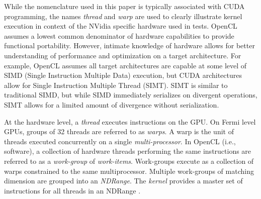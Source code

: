 
While the nomenclature used in this paper is typically associated with CUDA programming, the names \textit{thread} and \textit{warp} are used to clearly illustrate kernel execution in context of the NVidia specific hardware used in tests. OpenCL assumes a lowest common denominator of hardware capabilities to provide functional portability. However, intimate knowledge of hardware allows for better understanding of performance and optimization on a target architecture. For example, OpenCL assumes all target architectures are capable at some level of SIMD (Single Instruction Multiple Data) execution, but CUDA architectures allow for Single Instruction Multiple Thread (SIMT). SIMT is similar to traditional SIMD, but while SIMD immediately serializes on divergent operations, SIMT allows for a limited amount of divergence without serialization. 

At the hardware level, a \textit{thread} executes instructions on the GPU. On Fermi level GPUs, groups of 32 threads are referred to as \textit{warps}. A warp is the unit of threads executed concurrently on a single \textit{multi-processor}. 
In OpenCL (i.e., software), a collection of hardware threads performing the same instructions are referred to as a \textit{work-group} of \textit{work-items}. Work-groups execute as a collection of warps constrained to the same multiprocessor. Multiple work-groups of matching dimension are grouped into an \textit{NDRange}. The \textit{kernel} provides a master set of instructions
for all threads in an NDRange \cite{OpenCL2009}. 


